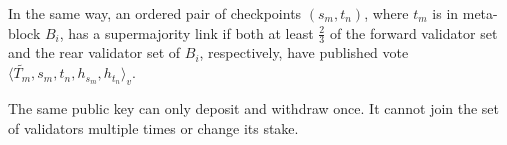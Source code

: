 \documentclass[12pt,a4paper]{article}
\newcommand{\B}{\mathcal{B}}
\newcommand{\BS}{\operatorname{BS}}
\newcommand{\BE}{\operatorname{BE}}
\begin{document}
 In the same way, an ordered pair of checkpoints $(s_m, t_n)$, where $t_m$ is in meta-block $B_i$, has a supermajority link if both at least $\frac{2}{3}$ of the forward validator set and the rear validator set of $B_i$, respectively, have published vote $\langle \tilde{T_m}, s_m, t_n, h_{s_m}, h_{t_n}\rangle_v$.

The same public key can only deposit and withdraw once.
It cannot join the set of validators multiple times or change its stake.







%


\end{document}
